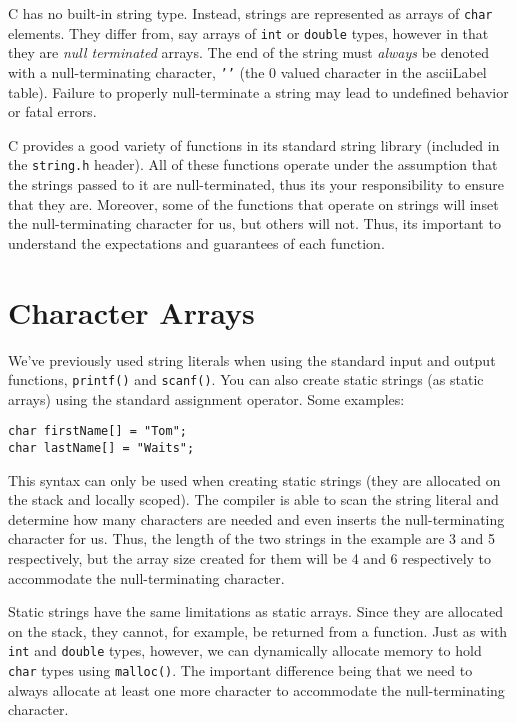 

C has no built-in string type.  Instead, strings are represented
as arrays of \texttt{char} elements.  They differ from, say
arrays of \texttt{int} or \texttt{double} types, however
in that they are \emph{null terminated} arrays.  The end of the
string must \emph{always} be denoted with a null-terminating 
character, \texttt{'\0'} (the 0 valued character in the \gls{asciiLabel}
table).  Failure to properly null-terminate a string may lead
to undefined behavior or fatal errors.  

C provides a good variety of functions in its standard string library
(included in the \texttt{string.h} header).  All of these 
functions operate under the assumption that the strings passed
to it are null-terminated, thus its your responsibility to ensure that
they are.  Moreover, some of the functions that operate on strings
will inset the null-terminating character for us, but others will not.
Thus, its important to understand the expectations and guarantees
of each function.  



\section{Character Arrays}

We've previously used string literals when using the standard input
and output functions, \texttt{printf()} and \texttt{scanf()}.
You can also create static strings (as static arrays) using the standard
assignment operator.  Some examples:

\begin{verbatim}
char firstName[] = "Tom";
char lastName[] = "Waits";
\end{verbatim}

This syntax can only be used when creating static strings (they are
allocated on the stack and locally scoped).  The compiler is able
to scan the string literal and determine how many characters are
needed and even inserts the null-terminating character for us.  Thus, 
the length of the two strings in the example are 3 and 5 respectively, 
but the array size created for them will be 4 and 6 respectively to 
accommodate the null-terminating character.

Static strings have the same limitations as static arrays.  Since they
are allocated on the stack, they cannot, for example, be returned from
a function.  Just as with \texttt{int} and \texttt{double} 
types, however, we can dynamically allocate memory to hold \texttt{char}
types using \texttt{malloc()}.  The important difference being
that we need to always allocate at least one more character to accommodate
the null-terminating character.

